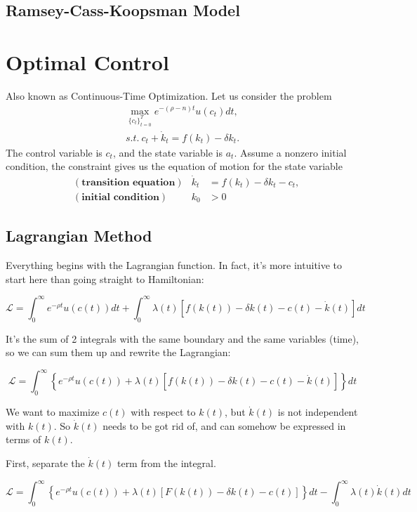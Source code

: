 \documentclass[11pt,a4paper]{book}
\theoremstyle{definition}\newtheorem{definition}{Definition}
\theoremstyle{definition}\newtheorem{fact}{Fact}
\theoremstyle{definition}\newtheorem{remark}{Remark}
\theoremstyle{definition}\newtheorem{ex}{Ex.}
\theoremstyle{definition}\newtheorem{project}{Project}
\theoremstyle{definition}\newtheorem{problem}{Problem}
\theoremstyle{definition}\newtheorem{example}{Example}
\numberwithin{theorem}{section}
\numberwithin{corollary}{chapter}
\numberwithin{assumption}{chapter}
\numberwithin{definition}{chapter}
\numberwithin{prop}{chapter}
\numberwithin{notation}{chapter}
\numberwithin{problem}{chapter}
\numberwithin{example}{chapter}
\numberwithin{fact}{chapter}
\numberwithin{ex}{chapter}
\begin{document}
	\section{Ramsey-Cass-Koopsman Model}
	
	\chapter{Optimal Control}
	Also known as Continuous-Time Optimization. Let us consider the problem
	\begin{align}
		\max_{ \{c_t\}^T_{t=0} } e^{-(\rho-n) t} u(c_t)  dt, \\
		s.t. \ c_t + \dot{k}_t = f(k_t) - \delta k_t.
	\end{align}
	The control variable is $c_t$, and the state variable is $a_t$. Assume a nonzero initial condition, the constraint gives us the equation of motion for the state variable
	\begin{align*}
		&(\textbf{transition equation}) & \dot{k}_t &= f(k_t) - \delta k_t - c_t, \\
		&(\textbf{initial condition}) & k_0 &> 0
	\end{align*}

	
	\section{Lagrangian Method}
	Everything begins with the Lagrangian function. In fact, it's more intuitive to start here than going straight to Hamiltonian:

$$
    \mathcal{L} = \int_{0}^{\infty} e^{-\rho t} u(c(t)) dt + \int_{0}^{\infty} \lambda(t) \left[ f( k(t)) - \delta k(t) - c(t) - \dot{k}(t) \right] dt
$$

It's the sum of 2 integrals with the same boundary and the same variables (time), so we can sum them up and rewrite the Lagrangian:

$$
    \mathcal{L} = \int_{0}^{\infty} \left\{ e^{-\rho t} u(c(t)) + \lambda(t) \left[ f( k(t)) - \delta k(t) - c(t) - \dot{k}(t) \right] \right\} dt
$$

We want to maximize $c(t)$ with respect to $k(t)$, but $\dot{k}(t)$ is not independent with $k(t)$. So $\dot{k}(t)$ needs to be got rid of, and can somehow be expressed in terms of $k(t)$.

First, separate the $\dot{k}(t)$ term from the integral.

$$
    \mathcal{L} = \int_{0}^{\infty} \left\{ e^{-\rho t} u(c(t)) + \lambda(t) \left[ F( k(t)) - \delta k(t) - c(t)  \right] \right\} dt - \int_{0}^{\infty} \lambda(t)\dot{k}(t)dt
$$
\end{document}
